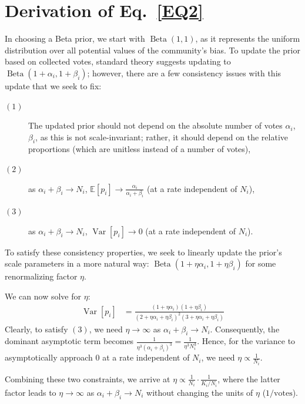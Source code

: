\documentclass[format=acmsmall, review=true, screen=true, anonymous=true]{acmart}
\begin{document}

\section{Derivation of Eq.~\eqref{EQ2}}
In choosing a Beta prior, we start with $\operatorname{Beta}(1,1)$, as it represents the uniform distribution over all potential values of the community's bias.  To update the prior based on collected votes, standard theory suggests updating to $\operatorname{Beta}(1+\alpha_i,1+\beta_i)$; however, there are a few consistency issues with this update that we seek to fix:
\begin{description}
\item[$(1)$] The updated prior should not depend on the absolute number of votes $\alpha_i$, $\beta_i$, as this is not scale-invariant; rather, it should depend on the relative proportions (which are unitless instead of a number of votes),
\item[$(2)$] as $\alpha_i + \beta_i \rightarrow N_i$, $\mathbb{E}[p_i] \rightarrow \frac{\alpha_i}{\alpha_i+\beta_i}$ (at a rate independent of $N_i$),
\item[$(3)$] as $\alpha_i + \beta_i \rightarrow N_i$, $\operatorname{Var}[p_i] \rightarrow 0$ (at a rate independent of $N_i$).
\end{description}
To satisfy these consistency properties, we seek to linearly update the prior's scale parameters in a more natural way: $\operatorname{Beta}(1+\eta\alpha_i,1+\eta\beta_i)$ for some renormalizing factor $\eta$.

We can now solve for $\eta$:
\begin{align*}
\operatorname{Var}[p_i] &= \frac{(1+\eta\alpha_i)(1+\eta\beta_i)}{(2+\eta\alpha_i+\eta\beta_i)^2(3+\eta\alpha_i+\eta\beta_i)}
\end{align*}
Clearly, to satisfy $(3)$, we need $\eta \rightarrow \infty$ as $\alpha_i + \beta_i \rightarrow N_i$.  Consequently, the dominant asymptotic term becomes $\frac{1}{\eta^3 (\alpha_i + \beta_i)^3} = \frac{1}{\eta^3 N_i^3}$.  Hence, for the variance to asymptotically approach $0$ at a rate independent of $N_i$, we need $\eta \propto \frac{1}{N_i}$.

Combining these two constraints, we arrive at $\eta \propto \frac{1}{N_i}\cdot \frac{1}{K_i/N_i}$, where the latter factor leads to $\eta \rightarrow \infty$ as $\alpha_i + \beta_i \rightarrow N_i$ without changing the units of $\eta$ ($1/\text{votes}$).
\end{document}

